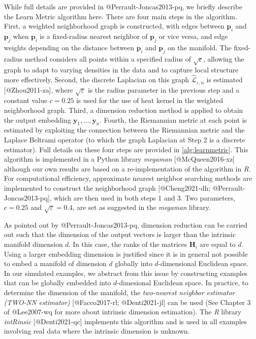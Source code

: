\documentclass[
]{article}
\begin{document}
While full details are provided in @Perrault-Joncas2013-pq, we briefly
describe the Learn Metric algorithm here. There are four main steps in
the algorithm. First, a weighted neighborhood graph is constructed, with
edges between \(\bm{p}_i\) and \(\bm{p}_j\) when \(\bm{p}_i\) is a
fixed-radius nearest neighbor of \(\bm{p}_j\) or vice versa, and edge
weights depending on the distance between \(\bm{p}_i\) and \(\bm{p}_j\)
on the manifold. The fixed-radius method considers all points within a
specified radius of \(\sqrt{\epsilon}\), allowing the graph to adapt to
varying densities in the data and to capture local structure more
effectively. Second, the discrete Laplacian on this graph
\(\hat{\mathcal{L}}_{\varepsilon,n}\) is estimated {[}@Zhou2011-za{]},
where \(\sqrt{\varepsilon}\) is the radius parameter in the previous
step and a constant value \(c=0.25\) is used for the use of heat kernel
in the weighted neighborhood graph. Third, a dimension reduction method
is applied to obtain the output embedding \(\bm{y}_1,\dots,\bm{y}_n\).
Fourth, the Riemannian metric at each point is estimated by exploiting
the connection between the Riemannian metric and the Laplace Beltrami
operator (to which the graph Laplacian at Step 2 is a discrete
estimator). Full details on these four steps are provided in
\autoref{alg:learnmetric}. This algorithm is implemented in a Python
library \emph{megaman} {[}@McQueen2016-xz{]} although our own results
are based on a re-implementation of the algorithm in \emph{R}. For
computational efficiency, approximate nearest neighbor searching methods
are implemented to construct the neighborhood graph {[}@Cheng2021-dh;
@Perrault-Joncas2013-pq{]}, which are then used in both steps 1 and 3.
Two parameters, \(c=0.25\) and \(\sqrt{\varepsilon} = 0.4\), are set as
suggested in the \emph{megaman} library.

As pointed out by @Perrault-Joncas2013-pq, dimension reduction can be
carried out such that the dimension of the output vectors is larger than
the intrinsic manifold dimension \(d\). In this case, the ranks of the
matrices \(\bm{H}_i\) are equal to \(d\). Using a larger embedding
dimension is justified since it is in general not possible to embed a
manifold of dimension \(d\) globally into \(d\)-dimensional Euclidean
space. In our simulated examples, we abstract from this issue by
constructing examples that can be globally embedded into
\(d\)-dimesional Euclidean space. In practice, to determine the
dimension of the manifold, the \emph{two-nearest neighbor estimator
(TWO-NN estimator)} {[}@Facco2017-rl; @Denti2021-jl{]} can be used (See
Chapter 3 of @Lee2007-wq for more about intrinsic dimension estimation).
The \emph{R} library \emph{intRinsic} {[}@Denti2021-qc{]} implements
this algorithm and is used in all examples involving real data where the
intrinsic dimension is unknown.
\end{document}
